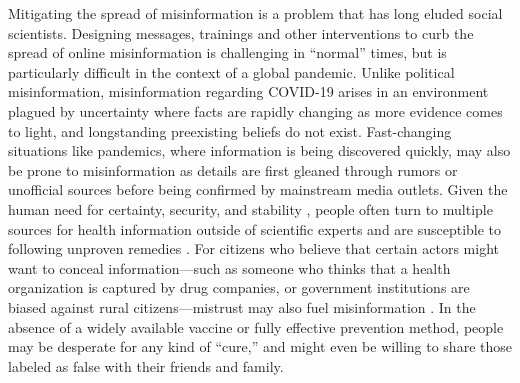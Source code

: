 \documentclass[letterpaper, 12pt, parskip=full,DIV=10]{scrartcl}
\begin{document}
Mitigating the spread of misinformation is a problem that has long eluded social scientists. Designing messages, trainings and other interventions to curb the spread of online misinformation is challenging in ``normal'' times, but is particularly difficult in the context of a global pandemic. Unlike political misinformation, misinformation regarding COVID-19 arises in an environment plagued by uncertainty where facts are rapidly changing as more evidence comes to light, and longstanding preexisting beliefs do not exist. Fast-changing situations like pandemics, where information is being discovered quickly, may also be prone to misinformation as details are first gleaned through rumors or unofficial sources before being confirmed by mainstream media outlets. Given the human need for certainty, security, and stability \citep{leotti2010born}, people often turn to multiple sources for health information outside of scientific experts and are susceptible to following unproven remedies \citep{swire2020public}. For citizens who believe that certain actors might want to conceal information---such as someone who thinks that a health organization is captured by drug companies, or government institutions are biased against rural citizens---mistrust may also fuel misinformation \citep{vinck2019institutional}. In the absence of a widely available vaccine or fully effective prevention method, people may be desperate for any kind of ``cure,'' and might even be willing to share those labeled as false with their friends and family. %

\end{document}
